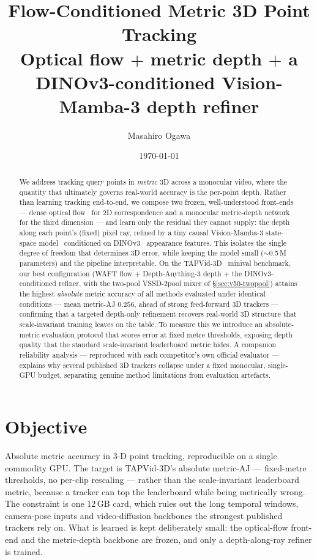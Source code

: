 \documentclass[11pt,a4paper]{article}
\title{\textbf{Flow-Conditioned Metric 3D Point Tracking}\\[2pt]
\large Optical flow $+$ metric depth $+$ a DINOv3-conditioned Vision-Mamba-3 depth refiner}
\author{Masahiro Ogawa}
\date{\today}
\begin{document}
\maketitle

\begin{abstract}
We address tracking query points in \emph{metric} 3D across a monocular video, where the
quantity that ultimately governs real-world accuracy is the per-point depth. Rather than learning
tracking end-to-end, we compose two frozen, well-understood front-ends --- dense optical
flow~\cite{searaft,waft} for 2D correspondence and a monocular metric-depth
network~\cite{da3} for the third dimension --- and learn only the residual they cannot supply:
the depth along each point's (fixed) pixel ray, refined by a tiny causal Vision-Mamba-3 state-space
model~\cite{mamba3} conditioned on DINOv3~\cite{dinov3} appearance features. This isolates the
single degree of freedom that determines 3D error, while keeping the model small ($\sim$0.5\,M
parameters) and the pipeline interpretable.
On the TAPVid-3D~\cite{tapvid3d} minival benchmark, our best configuration (WAFT flow $+$
Depth-Anything-3 depth $+$ the DINOv3-conditioned refiner, with the two-pool
VSSD-2pool mixer of \S\ref{sec:v50-twopool}) attains the highest \emph{absolute}
metric accuracy of all methods evaluated under identical conditions --- mean metric-AJ $0.256$,
ahead of strong feed-forward 3D trackers --- confirming that a targeted depth-only refinement
recovers real-world 3D structure that scale-invariant training leaves on the table. To measure
this we introduce an absolute-metric evaluation protocol that scores error at fixed metre
thresholds, exposing depth quality that the standard scale-invariant leaderboard metric hides.
A companion reliability analysis --- reproduced with each competitor's own official evaluator ---
explains why several published 3D trackers collapse under a fixed monocular, single-GPU budget,
separating genuine method limitations from evaluation artefacts.
\end{abstract}

\tableofcontents

\section{Objective}
\label{sec:objective}
Absolute metric accuracy in 3-D point tracking, reproducible on a single commodity
GPU. The target is TAPVid-3D's absolute metric-AJ --- fixed-metre thresholds, no
per-clip rescaling --- rather than the scale-invariant leaderboard metric, because a
tracker can top the leaderboard while being metrically wrong. The constraint is one
12\,GB card, which rules out the long temporal windows, camera-pose inputs and
video-diffusion backbones the strongest published trackers rely on. What is learned is
kept deliberately small: the optical-flow front-end and the metric-depth backbone are
frozen, and only a depth-along-ray refiner is trained.
\end{document}
